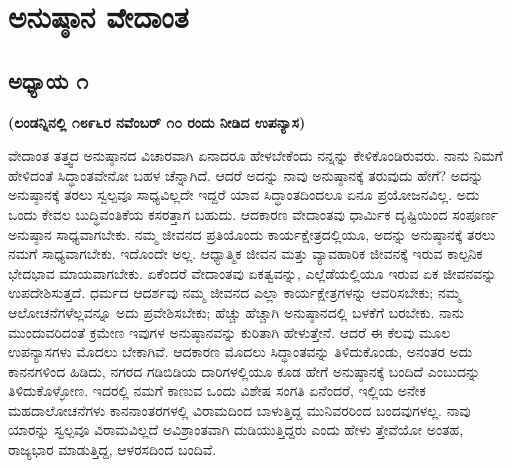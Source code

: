 

\part{ಅನುಷ್ಠಾನ ವೇದಾಂತ}

\chapter{ಅಧ್ಯಾಯ ೧}

\begin{center}
\textbf{(ಲಂಡನ್ನಿನಲ್ಲಿ ೧೮೯೬ರ ನವೆಂಬರ್​ ೧೦ ರಂದು ನೀಡಿದ ಉಪನ್ಯಾಸ)}
\end{center}

ವೇದಾಂತ ತತ್ತ್ವದ ಅನುಷ್ಠಾನದ ವಿಚಾರವಾಗಿ ಏನಾದರೂ ಹೇಳಬೇಕೆಂದು ನನ್ನನ್ನು ಕೇಳಿಕೊಂಡಿರುವರು. ನಾನು ನಿಮಗೆ ಹೇಳಿದಂತೆ ಸಿದ್ಧಾಂತವೇನೋ ಬಹಳ ಚೆನ್ನಾಗಿದೆ. ಆದರೆ ಅದನ್ನು ನಾವು ಅನುಷ್ಠಾನಕ್ಕೆ ತರುವುದು ಹೇಗೆ? ಅದನ್ನು ಅನುಷ್ಠಾನಕ್ಕೆ ತರಲು ಸ್ವಲ್ಪವೂ ಸಾಧ್ಯವಿಲ್ಲದೇ ಇದ್ದರೆ ಯಾವ ಸಿದ್ಧಾಂತದಿಂದಲೂ ಏನೂ ಪ್ರಯೋಜನವಿಲ್ಲ. ಅದು ಒಂದು ಕೇವಲ ಬುದ್ಧಿವಂತಿಕೆಯ ಕಸರತ್ತಾಗ ಬಹುದು. ಆದಕಾರಣ ವೇದಾಂತವು ಧಾರ್ಮಿಕ ದೃಷ್ಟಿಯಿಂದ ಸಂಪೂರ್ಣ ಅನುಷ್ಠಾನ ಸಾಧ್ಯವಾಗಬೇಕು. ನಮ್ಮ ಜೀವನದ ಪ್ರತಿಯೊಂದು ಕಾರ್ಯಕ್ಷೇತ್ರದಲ್ಲಿಯೂ, ಅದನ್ನು ಅನುಷ್ಠಾನಕ್ಕೆ ತರಲು ನಮಗೆ ಸಾಧ್ಯವಾಗಬೇಕು. ಇದೊಂದೇ ಅಲ್ಲ. ಆಧ್ಯಾತ್ಮಿಕ ಜೀವನ ಮತ್ತು ವ್ಯಾವಹಾರಿಕ ಜೀವನಕ್ಕೆ ಇರುವ ಕಾಲ್ಪನಿಕ ಭೇದಭಾವ ಮಾಯವಾಗಬೇಕು. ಏಕೆಂದರೆ ವೇದಾಂತವು ಏಕತ್ವವನ್ನು, ಎಲ್ಲೆಡೆಯಲ್ಲಿಯೂ ಇರುವ ಏಕ ಜೀವನವನ್ನು ಉಪದೇಶಿಸುತ್ತದೆ. ಧರ್ಮದ ಆದರ್ಶವು ನಮ್ಮ ಜೀವನದ ಎಲ್ಲಾ ಕಾರ್ಯಕ್ಷೇತ್ರಗಳನ್ನು ಆವರಿಸಬೇಕು; ನಮ್ಮ ಆಲೋಚನೆಗಳೆಲ್ಲವನ್ನೂ ಅದು ಪ್ರವೇಶಿಸಬೇಕು; ಹೆಚ್ಚು ಹೆಚ್ಚಾಗಿ ಅನುಷ್ಠಾನದಲ್ಲಿ ಬಳಕೆಗೆ ಬರಬೇಕು. ನಾನು ಮುಂದುವರಿದಂತೆ ಕ್ರಮೇಣ ಇವುಗಳ ಅನುಷ್ಠಾನವನ್ನು ಕುರಿತಾಗಿ ಹೇಳುತ್ತೇನೆ. ಆದರೆ ಈ ಕೆಲವು ಮೂಲ ಉಪನ್ಯಾಸಗಳು ಮೊದಲು ಬೇಕಾಗಿವೆ. ಆದಕಾರಣ ಮೊದಲು ಸಿದ್ಧಾಂತವನ್ನು ತಿಳಿದುಕೊಂಡು, ಅನಂತರ ಅದು ಕಾನನಗಳಿಂದ ಹಿಡಿದು, ನಗರದ ಗಡಿಬಿಡಿಯ ದಾರಿಗಳಲ್ಲಿಯೂ ಕೂಡ ಹೇಗೆ ಅನುಷ್ಠಾನಕ್ಕೆ ಬಂದಿದೆ ಎಂಬುದನ್ನು ತಿಳಿದುಕೊಳ್ಳೋಣ. ಇದರಲ್ಲಿ ನಮಗೆ ಕಾಣುವ ಒಂದು ವಿಶೇಷ ಸಂಗತಿ ಏನೆಂದರೆ, ಇಲ್ಲಿಯ ಅನೇಕ ಮಹದಾಲೋಚನೆಗಳು ಕಾನನಾಂತರಗಳಲ್ಲಿ ವಿರಾಮದಿಂದ ಬಾಳುತ್ತಿದ್ದ ಮುನಿವರರಿಂದ ಬಂದವುಗಳಲ್ಲ. ನಾವು ಯಾರನ್ನು ಸ್ವಲ್ಪವೂ ವಿರಾಮವಿಲ್ಲದೆ ಅವಿಶ್ರಾಂತವಾಗಿ ದುಡಿಯುತ್ತಿದ್ದರು ಎಂದು ಹೇಳು ತ್ತೇವೆಯೋ ಅಂತಹ, ರಾಜ್ಯಭಾರ ಮಾಡುತ್ತಿದ್ದ, ಆಳರಸದಿಂದ ಬಂದಿವೆ.

